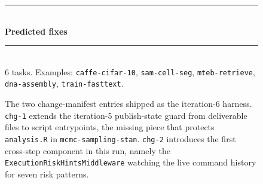 \begin{figure}[t]
\begin{tcbraster}
\begin{tcolorbox}[colback=aheTeal!12,colframe=aheBlue,colbacktitle=aheBlue,
                          title={\scriptsize\textbf{chg-2, iteration 6, commit \texttt{9651986}, level: middleware}}]
            \rule{\linewidth}{0.3pt}\\
            \textbf{\textcolor{aheBlue}{Predicted fixes}} \\
            \rule{\linewidth}{0.3pt}\\[1pt]
            6 tasks. Examples: \texttt{caffe-cifar-10}, \texttt{sam-cell-seg}, \texttt{mteb-retrieve}, \texttt{dna-assembly}, \texttt{train-fasttext}.
        \end{tcolorbox}
    \end{tcbraster}
    \caption{The two change-manifest entries shipped as the iteration-6 harness. \texttt{chg-1} extends the iteration-5 publish-state guard from deliverable files to script entrypoints, the missing piece that protects \texttt{analysis.R} in \texttt{mcmc-sampling-stan}. \texttt{chg-2} introduces the first cross-step component in this run, namely the \texttt{ExecutionRiskHintsMiddleware} watching the live command history for seven risk patterns.}
    \label{fig:manifest-middleware}
\end{figure}
